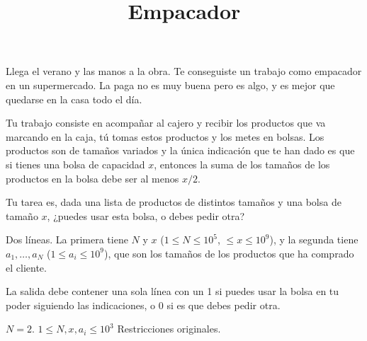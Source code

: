 \documentclass{oci}
\title{Empacador}
\begin{document}
\begin{problemDescription}
Llega el verano y las manos a la obra.
Te conseguiste un trabajo como empacador en un supermercado.
La paga no es muy buena pero es algo, y es mejor que quedarse en la casa todo el día.

Tu trabajo consiste en acompañar al cajero y recibir los productos que va marcando en la caja, tú tomas estos productos y los metes en bolsas. Los productos son de tamaños variados y la única indicación que te han dado es que si tienes una bolsa de capacidad $x$, entonces la suma de los tamaños de los productos en la bolsa debe ser al menos $x/2$.

Tu tarea es, dada una lista de productos de distintos tamaños y una bolsa de tamaño $x$, ¿puedes usar esta bolsa, o debes pedir otra? 

\end{problemDescription}

\begin{inputDescription}
Dos líneas. La primera tiene $N$ y $x$ ($1\leq N\leq 10^5$, $\leq x \leq 10^9$), y la segunda tiene $a_1,\ldots, a_N$ ($1\leq a_i\leq 10^9$), que son los tamaños de los productos que ha comprado el cliente.
\end{inputDescription}

\begin{outputDescription}
La salida debe contener una sola línea con un 1 si puedes usar la bolsa en tu poder siguiendo las indicaciones, o 0 si es que debes pedir otra.
\end{outputDescription}

\begin{scoreDescription}
  $N = 2$.
  $1 \leq N, x, a_i \leq 10^3$
  Restricciones originales.
\end{scoreDescription}

\begin{sampleDescription}
\end{sampleDescription}
\end{document}
